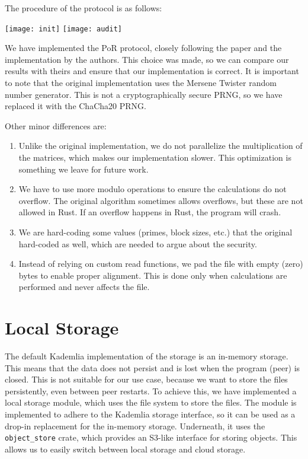 The procedure of the protocol is as follows:

\begin{center}
\texttt{[image: init]}
\texttt{[image: audit]}
\end{center}

We have implemented the PoR protocol, closely following the paper and the implementation by the authors.
This choice was made, so we can compare our results with theirs and ensure that our implementation is correct.
It is important to note that the original implementation uses the Mersene Twister random number generator.
This is not a cryptographically secure PRNG, so we have replaced it with the ChaCha20 PRNG\cite{chacha}.


Other minor differences are:
\begin{enumerate}
    \item Unlike the original implementation, we do not parallelize the multiplication of the matrices,
        which makes our implementation slower.
        This optimization is something we leave for future work.
    \item We have to use more modulo operations to ensure the calculations do not overflow.
        The original algorithm sometimes allows overflows, but these are not allowed in Rust.
        If an overflow happens in Rust, the program will crash.
    \item We are hard-coding some values (primes, block sizes, etc.) that the original hard-coded as well, which are needed to argue about the security.
    \item Instead of relying on custom read functions, we pad the file with empty (zero) bytes to enable proper alignment.
        This is done only when calculations are performed and never affects the file.
\end{enumerate}

\section{Local Storage}

The default Kademlia implementation of the storage is an in-memory storage.
This means that the data does not persist and is lost when the program (peer) is closed.
This is not suitable for our use case, because we want to store the files persistently, even between peer restarts.
To achieve this, we have implemented a local storage module, which uses the file system to store the files.
The module is implemented to adhere to the Kademlia storage interface, so it can be used as a drop-in replacement for the in-memory storage.
Underneath, it uses the \texttt{object\_store} crate, which provides an S3-like interface for storing objects.
This allows us to easily switch between local storage and cloud storage.

